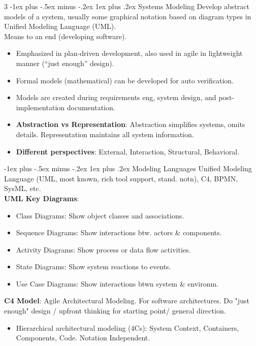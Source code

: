\documentclass[a4paper, 10pt, landscape]{article}
\makeatletter
\renewcommand{\subsubsection}{\@startsection{subsubsection}{3}{0mm}%
                                {-1ex plus -.5ex minus -.2ex}%
                                {1ex plus .2ex}%
                                {\normalfont\small\bfseries}}
\makeatother
\begin{document}
\begin{multicols*}{3}
\subsubsection{Systems Modeling}
Develop abstract models of a system, usually some graphical notation based on diagram types in Unified Modeling Language (UML). \\
Means to an end (developing software). 
\begin{itemize}
	\item Emphasized in plan-driven development, also used in agile in lightweight manner (“just enough” design).
	\item Formal models (mathematical) can be developed for auto verification.
       \item Models are created during requirements eng, system design, and post-implementation documentation.
       \item \textbf{Abstraction vs Representation}: Abstraction simplifies systems, omits details. Representation maintains all system information.
       \item \textbf{Different perspectives}: External, Interaction, Structural, Behavioral.
\end{itemize}

\subsubsection{Modeling Languages}
Unified Modeling Language (UML, most known, rich tool support, stand. notn), C4, BPMN, SysML, etc.  \\ 
\smallskip
\textbf{UML Key Diagrams}:
\begin{itemize}
  	\setlength\itemsep{-0.1em}
	\item Class Diagrams: Show object classes and associations.
	\item Sequence Diagrams: Show interactions btw. actors \& components.
	\item Activity Diagrams: Show process or data flow activities.
	\item State Diagrams: Show system reactions to events.
	\item Use Case Diagrams: Show interactions btwn system \& environm.
\end{itemize}

\smallskip
\textbf{C4 Model}: Agile Architectural Modeling. For software architectures. Do "just enough" design / upfront thinking for starting point/ general direction.
\begin{itemize}
	\item Hierarchical architectural modeling (4Cs): System Context, Containers, Components, Code. Notation Independent.
\end{itemize}
    

\end{multicols*}
\end{document}
